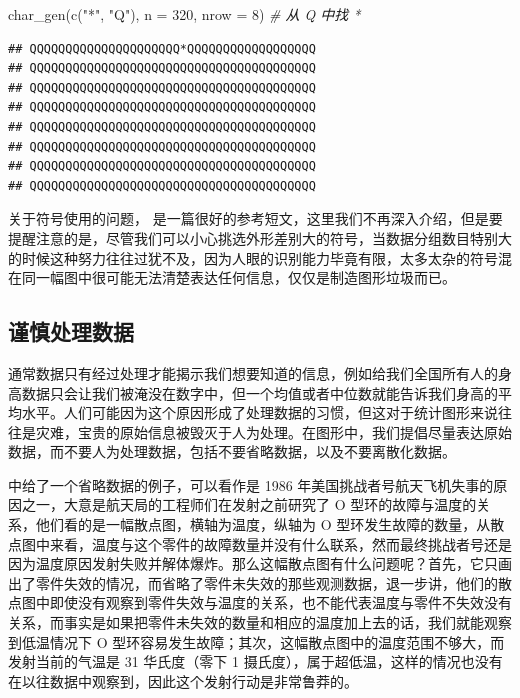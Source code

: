 \documentclass[
  b5paper,
  UTF8,twoside]{book}
\newenvironment{Shaded}{\begin{snugshade}}{\end{snugshade}}
\newcommand{\AttributeTok}[1]{\textcolor[rgb]{0.77,0.63,0.00}{#1}}
\newcommand{\CommentTok}[1]{\textcolor[rgb]{0.56,0.35,0.01}{\textit{#1}}}
\newcommand{\DecValTok}[1]{\textcolor[rgb]{0.00,0.00,0.81}{#1}}
\newcommand{\FunctionTok}[1]{\textcolor[rgb]{0.00,0.00,0.00}{#1}}
\newcommand{\NormalTok}[1]{#1}
\newcommand{\StringTok}[1]{\textcolor[rgb]{0.31,0.60,0.02}{#1}}
\begin{document}
\begin{Shaded}
\begin{Highlighting}[]
\FunctionTok{char\_gen}\NormalTok{(}\FunctionTok{c}\NormalTok{(}\StringTok{"*"}\NormalTok{, }\StringTok{"Q"}\NormalTok{), }\AttributeTok{n =} \DecValTok{320}\NormalTok{, }\AttributeTok{nrow =} \DecValTok{8}\NormalTok{) }\CommentTok{\# 从 Q 中找 *}
\end{Highlighting}
\end{Shaded}

\begin{verbatim}
## QQQQQQQQQQQQQQQQQQQQQ*QQQQQQQQQQQQQQQQQQ
## QQQQQQQQQQQQQQQQQQQQQQQQQQQQQQQQQQQQQQQQ
## QQQQQQQQQQQQQQQQQQQQQQQQQQQQQQQQQQQQQQQQ
## QQQQQQQQQQQQQQQQQQQQQQQQQQQQQQQQQQQQQQQQ
## QQQQQQQQQQQQQQQQQQQQQQQQQQQQQQQQQQQQQQQQ
## QQQQQQQQQQQQQQQQQQQQQQQQQQQQQQQQQQQQQQQQ
## QQQQQQQQQQQQQQQQQQQQQQQQQQQQQQQQQQQQQQQQ
## QQQQQQQQQQQQQQQQQQQQQQQQQQQQQQQQQQQQQQQQ
\end{verbatim}

关于符号使用的问题，\citet{Robinson03} 是一篇很好的参考短文，这里我们不再深入介绍，但是要提醒注意的是，尽管我们可以小心挑选外形差别大的符号，当数据分组数目特别大的时候这种努力往往过犹不及，因为人眼的识别能力毕竟有限，太多太杂的符号混在同一幅图中很可能无法清楚表达任何信息，仅仅是制造图形垃圾而已。

\hypertarget{subsec:data-processing}{%
\subsection{谨慎处理数据}\label{subsec:data-processing}}

通常数据只有经过处理才能揭示我们想要知道的信息，例如给我们全国所有人的身高数据只会让我们被淹没在数字中，但一个均值或者中位数就能告诉我们身高的平均水平。人们可能因为这个原因形成了处理数据的习惯，但这对于统计图形来说往往是灾难，宝贵的原始信息被毁灭于人为处理。在图形中，我们提倡尽量表达原始数据，而不要人为处理数据，包括不要省略数据，以及不要离散化数据。

\citet{Cleveland85} 中给了一个省略数据的例子，可以看作是 1986 年美国挑战者号航天飞机失事的原因之一，大意是航天局的工程师们在发射之前研究了 O 型环的故障与温度的关系，他们看的是一幅散点图，横轴为温度，纵轴为 O 型环发生故障的数量，从散点图中来看，温度与这个零件的故障数量并没有什么联系，然而最终挑战者号还是因为温度原因发射失败并解体爆炸。那么这幅散点图有什么问题呢？首先，它只画出了零件失效的情况，而省略了零件未失效的那些观测数据，退一步讲，他们的散点图中即使没有观察到零件失效与温度的关系，也不能代表温度与零件不失效没有关系，而事实是如果把零件未失效的数量和相应的温度加上去的话，我们就能观察到低温情况下 O 型环容易发生故障；其次，这幅散点图中的温度范围不够大，而发射当前的气温是 31 华氏度（零下 1 摄氏度），属于超低温，这样的情况也没有在以往数据中观察到，因此这个发射行动是非常鲁莽的。
\end{document}
